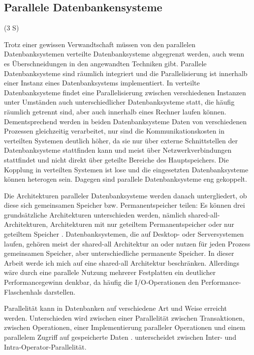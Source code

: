 \documentclass[a4paper,12pt,twoside]{article}
\begin{document}
\subsection{Parallele Datenbankensysteme} (3 S)

Trotz einer gewissen Verwandtschaft müssen von den parallelen Datenbanksystemen verteilte Datenbanksysteme abgegrenzt werden, auch wenn es Überschneidungen in den angewandten Techniken gibt. Parallele Datenbanksysteme sind räumlich integriert und die Parallelisierung ist innerhalb einer Instanz eines Datenbanksystems implementiert. In verteilte Datenbanksysteme findet eine Parallelisierung zwischen verschiedenen Instanzen unter Umständen auch unterschiedlicher Datenbanksysteme statt, die häufig räumlich getrennt sind, aber auch innerhalb eines Rechner laufen können. Dementsprechend werden in beiden Datenbanksysteme Daten von verschiedenen Prozessen gleichzeitig verarbeitet, nur sind die Kommunikationskosten in verteilten Systemen deutlich höher, da sie nur über externe Schnittstellen der Datenbanksysteme stattfinden kann und meist über Netzwerkverbindungen stattfindet und nicht direkt über geteilte Bereiche des Hauptspeichers. Die Kopplung in verteilten Systemen ist lose und die eingesetzten Datenbanksysteme können heterogen sein. Dagegen sind parallele Datenbanksysteme eng gekoppelt.

Die Architekturen paralleler Datenbanksysteme werden danach untergliedert, ob diese sich gemeinsamen Speicher bzw. Permanentspeicher teilen: Es können drei grundsätzliche Architekturen unterschieden werden, nämlich shared-all-Architekturen, Architekturen mit nur geteiltem Permanentspeicher oder nur geteiltem Speicher {\autocite{Yu1998}}. Datenbanksystemen, die auf Desktop- oder Serversystemen laufen, gehören meist der shared-all Architektur an oder nutzen für jeden Prozess gemeinsamen Speicher, aber unterschiedliche permanente Speicher. In dieser Arbeit werde ich mich auf eine shared-all Architektur beschränken. Allerdings wäre durch eine parallele Nutzung mehrerer Festplatten ein deutlicher Performancegewinn denkbar, da häufig die I/O-Operationen den Performance-Flaschenhals darstellen.

Parallelität kann in Datenbanken auf verschiedene Art und Weise erreicht werden. Unterschieden wird zwischen einer Parallelität zwischen Transaktionen, zwischen Operationen, einer Implementierung paralleler Operationen und einem parallelem Zugriff auf gespeicherte Daten {\autocite{Reuter1999}}. {\textcite [S. 1]{Yu1998}} unterscheidet zwischen Inter- und Intra-Operator-Parallelität.  
\end{document}
